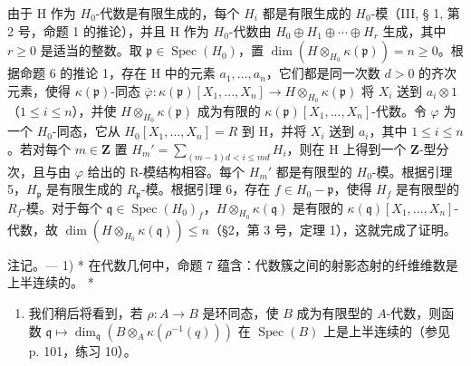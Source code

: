 由于 H 作为 \(H_{0}\)-代数是有限生成的，每个 \(H_{i}\) 都是有限生成的 \(H_{0}\)-模（III, § 1, 第 2 号，命题 1 的推论），并且 H 作为 \(H_{0}\)-代数由 \(H_{0} \oplus H_{1} \oplus \cdots \oplus H_{r}\) 生成，其中 \(r \geqslant 0\) 是适当的整数。取 \(\mathfrak{p} \in \operatorname{Spec}(H_{0})\)，置 \(\dim(H \otimes_{H_{0}} \kappa(\mathfrak{p})) = n \geqslant 0\)。根据命题 6 的推论 1，存在 H 中的元素 \(a_{1}, ..., a_{n}\)，它们都是同一次数 \(d > 0\) 的齐次元素，使得 \(\kappa(\mathfrak{p})\)-同态 \(\overline{\varphi}: \kappa(\mathfrak{p})[X_{1}, ..., X_{n}] \to H \otimes_{H_{0}} \kappa(\mathfrak{p})\) 将 \(X_{i}\) 送到 \(a_{i} \otimes 1\)（\(1 \leqslant i \leqslant n\)），并使 \(H \otimes_{H_{0}} \kappa(\mathfrak{p})\) 成为有限的 \(\kappa(\mathfrak{p})[X_{1}, ..., X_{n}]\)-代数。令 \(\varphi\) 为一个 \(H_{0}\)-同态，它从 \(H_{0}[X_{1}, ..., X_{n}] = R\) 到 H，并将 \(X_{i}\) 送到 \(a_{i}\)，其中 \(1 \leqslant i \leqslant n\)。若对每个 \(m \in \mathbf{Z}\) 置 \(H_{m}' = \sum_{(m-1)d < i \leqslant md} H_{i}\)，则在 H 上得到一个 \(\mathbf{Z}\)-型分次，且与由 \(\varphi\) 给出的 R-模结构相容。每个 \(H_{m}'\) 都是有限型的 \(H_{0}\)-模。根据引理 5，\(H_{\mathfrak{p}}\) 是有限生成的 \(R_{\mathfrak{p}}\)-模。根据引理 6，存在 \(f \in H_{0} - \mathfrak{p}\)，使得 \(H_{f}\) 是有限型的 \(R_{f}\)-模。对于每个 \(\mathfrak{q} \in \operatorname{Spec}(H_{0})_{f}\)，\(H \otimes_{H_{0}} \kappa(\mathfrak{q})\) 是有限的 \(\kappa(\mathfrak{q})[X_{1}, ..., X_{n}]\)-代数，故 \(\dim(H \otimes_{H_{0}} \kappa(\mathfrak{q})) \leqslant n\)（\S 2，第 3 号，定理 1），这就完成了证明。

注记。--- 1) * 在代数几何中，命题 7 蕴含：代数簇之间的射影态射的纤维维数是上半连续的。 *

\begin{enumerate}
\def\labelenumi{\arabic{enumi})}
\setcounter{enumi}{1}
\tightlist
\item
  我们稍后将看到，若 \(\rho:A\to B\) 是环同态，使 \(B\) 成为有限型的 \(A\)-代数，则函数 \(\mathfrak{q}\mapsto\dim_{\mathfrak{q}}(B\otimes_{A}\kappa(\rho^{-1}(q)))\) 在 \(\operatorname{Spec}(B)\) 上是上半连续的（参见 p. 101，练习 10）。
\end{enumerate}

